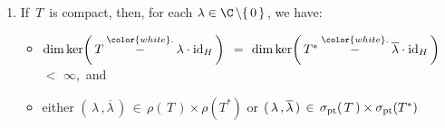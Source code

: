 \begin{theorem}
\begin{enumerate}
\item
	If \,$T$\, is compact, then, for each $\lambda \in \C \left\backslash\{\,0\,\}\right.$, we have:
	\begin{itemize}
	\item
		$\dim\ker\!\left(\,T \overset{{\color{white}.}}{-} \lambda\cdot\textnormal{id}_{H}\,\right)$
		$=$
		$\dim\ker\!\left(\,T^{*} \overset{{\color{white}.}}{-} \overline{\lambda}\cdot\textnormal{id}_{H}\,\right)$
		$<$ $\infty$,\, and
	\item
		either\;\;
		$(\,\lambda\,, \overline{\lambda}\,) \,\in\, \rho(\,T\,) \times \rho(T^{*})$
		\;\; or \;\;
		$(\,\lambda\,, \overline{\lambda}\,) \,\in\, \sigma_{\textnormal{pt}}(\,T\,) \times \sigma_{\textnormal{pt}}(T^{*})$
	\end{itemize}
\end{enumerate}
\end{theorem}

